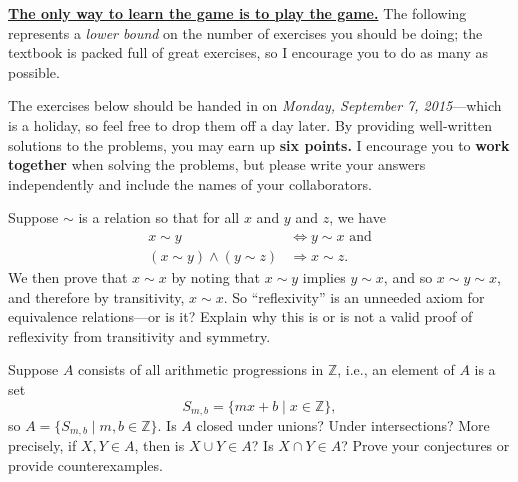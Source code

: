 \documentclass[12pt]{pset}
\author{Jim Fowler}
\date{Autumn 2015}
\newcommand{\Z}{\mathbb{Z}}
\begin{document}
\maketitle

\noindent\textbf{\href{http://en.wikipedia.org/wiki/List_of_games_with_concealed_rules}{The only way to learn the game is to play the game.}}
The following represents a \textit{lower bound} on the number of
exercises you should be doing; the textbook is packed full of great
exercises, so I encourage you to do as many as possible.

The exercises below should be handed in on \textit{Monday, September
  7, 2015}---which is a holiday, so feel free to drop them off a day
later.  By providing well-written solutions to the problems, you may
earn up \textbf{six points.}  I encourage you to \textbf{work
  together} when solving the problems, but please write your answers
independently and include the names of your collaborators.

\begin{problem}

  Suppose $\sim $ is a relation so that for all $x$ and $y$ and $z$, we have
  \begin{align*}
    x \sim  y &\Leftrightarrow y \sim  x  \mbox{ and} \\
    \left(x \sim  y\right) \wedge \left( y \sim  z \right) &\Rightarrow x \sim  z.
  \end{align*}
  We then prove that $x \sim x$ by noting that $x \sim y$ implies
  $y \sim x$, and so $x \sim y \sim x$, and therefore by transitivity,
  $x \sim x$.  So ``reflexivity'' is an unneeded axiom for equivalence
  relations---or is it?  Explain why this is or is not a valid proof
  of reflexivity from transitivity and symmetry.

\end{problem}

\begin{problem}

  Suppose $A$ consists of all arithmetic progressions in $\mathbb{Z}$,
  i.e., an element of $A$ is a set 
  \[
  S_{m,b} = \{ mx + b \mid x \in \Z \},
  \]
  so $A = \{ S_{m,b} \mid m, b \in \Z \}$.
  Is $A$ closed under unions?  Under intersections?  More precisely,
  if $X, Y \in A$, then is $X \cup Y \in A$?  Is $X \cap Y \in A$?
  Prove your conjectures or provide counterexamples.

\end{problem}
\end{document}
